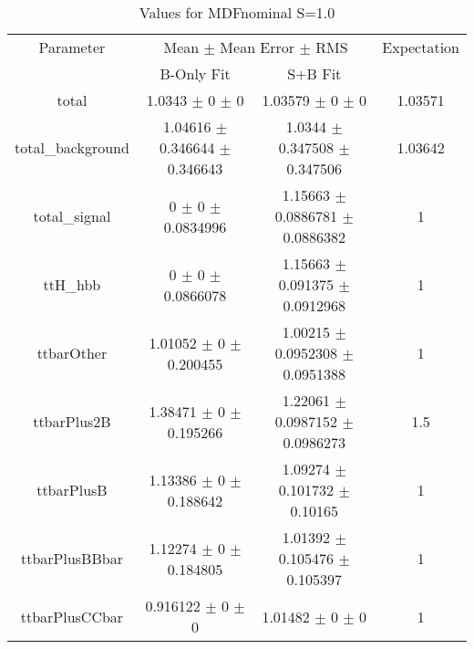 \begin{table}
\centering
\caption{Values for MDFnominal S=1.0}
\begin{tabular}{cccc}
\toprule
Parameter & \multicolumn{2}{c}{Mean $\pm$ Mean Error $\pm$ RMS} & Expectation\\
 & B-Only Fit & S+B Fit & \\
\midrule
total & \num{1.0343} $\pm$ \num{0} $\pm$ \num{0} & \num{1.03579} $\pm$ \num{0} $\pm$ \num{0} & \num{1.03571}\\
total\_background & \num{1.04616} $\pm$ \num{0.346644} $\pm$ \num{0.346643} & \num{1.0344} $\pm$ \num{0.347508} $\pm$ \num{0.347506} & \num{1.03642}\\
total\_signal & \num{0} $\pm$ \num{0} $\pm$ \num{0.0834996} & \num{1.15663} $\pm$ \num{0.0886781} $\pm$ \num{0.0886382} & \num{1}\\
ttH\_hbb & \num{0} $\pm$ \num{0} $\pm$ \num{0.0866078} & \num{1.15663} $\pm$ \num{0.091375} $\pm$ \num{0.0912968} & \num{1}\\
ttbarOther & \num{1.01052} $\pm$ \num{0} $\pm$ \num{0.200455} & \num{1.00215} $\pm$ \num{0.0952308} $\pm$ \num{0.0951388} & \num{1}\\
ttbarPlus2B & \num{1.38471} $\pm$ \num{0} $\pm$ \num{0.195266} & \num{1.22061} $\pm$ \num{0.0987152} $\pm$ \num{0.0986273} & \num{1.5}\\
ttbarPlusB & \num{1.13386} $\pm$ \num{0} $\pm$ \num{0.188642} & \num{1.09274} $\pm$ \num{0.101732} $\pm$ \num{0.10165} & \num{1}\\
ttbarPlusBBbar & \num{1.12274} $\pm$ \num{0} $\pm$ \num{0.184805} & \num{1.01392} $\pm$ \num{0.105476} $\pm$ \num{0.105397} & \num{1}\\
ttbarPlusCCbar & \num{0.916122} $\pm$ \num{0} $\pm$ \num{0} & \num{1.01482} $\pm$ \num{0} $\pm$ \num{0} & \num{1}\\
\bottomrule
\end{tabular}
\end{table}